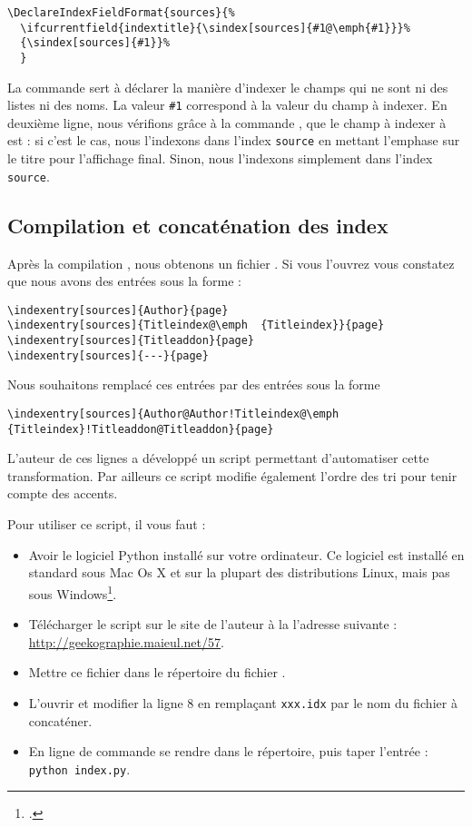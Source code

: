 {\begin{verbatim}
\DeclareIndexFieldFormat{sources}{%
  \ifcurrentfield{indextitle}{\sindex[sources]{#1@\emph{#1}}}%
  {\sindex[sources]{#1}}%
  }
\end{verbatim}

La commande  sert à déclarer la manière d'indexer le champs qui ne sont ni des listes ni des noms. La valeur \verb|#1| correspond à la valeur du champ à indexer. En deuxième ligne, nous vérifions grâce à la commande , que le champ à indexer à est  : si c'est le cas, nous l'indexons dans l'index \verb|source| en mettant l'emphase sur le titre pour l'affichage final. Sinon, nous l'indexons simplement dans l'index \verb|source|.

\subsection{Compilation et concaténation des index}


Après la  compilation \XeLaTeX, nous obtenons un fichier . Si vous l'ouvrez vous constatez que nous avons des entrées sous la forme : 

\begin{verbatim}
\indexentry[sources]{Author}{page}
\indexentry[sources]{Titleindex@\emph  {Titleindex}}{page}
\indexentry[sources]{Titleaddon}{page}
\indexentry[sources]{---}{page}
\end{verbatim}

Nous souhaitons remplacé ces entrées par des entrées sous la forme 

\begin{verbatim}
\indexentry[sources]{Author@Author!Titleindex@\emph  {Titleindex}!Titleaddon@Titleaddon}{page}
\end{verbatim}

L'auteur de ces lignes a développé un script permettant d'automatiser cette transformation. Par ailleurs ce script modifie également l'ordre des tri pour tenir compte des accents.

Pour utiliser ce script, il vous faut :\label{python}
\begin{itemize}
\item Avoir le logiciel Python installé sur votre ordinateur. Ce logiciel est installé en standard sous Mac Os X et sur la plupart des distributions Linux, mais pas sous Windows\footcite{python_windows}.
\item Télécharger le script sur le site de l'auteur à la l'adresse suivante : \url{http://geekographie.maieul.net/57}.
\item Mettre ce fichier dans le répertoire du fichier . 
\item L'ouvrir et modifier la ligne 8 en remplaçant \verb|xxx.idx| par le nom du fichier à concaténer.
\item En ligne de commande se rendre dans le  répertoire, puis taper l'entrée : \verb|python index.py|.
\end{itemize}


}
